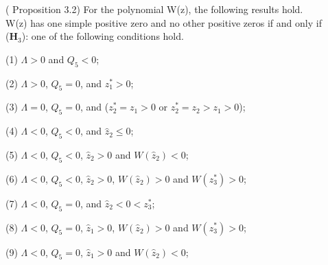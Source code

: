 \documentclass{CMHPhD-SIVD}
\begin{document}
\begin{lemma}\label{3.2} (\cite{wang2019hopf} Proposition 3.2) For the polynomial W(z), the following results hold.\\
W(z) has one simple positive zero and no other positive zeros if and only if
\\ ($\mathbf{H}_3$): one of the
following conditions hold.

(1) $\Lambda>0$ and $Q_5<0$;

(2) $\Lambda>0$, $Q_5=0$, and $z_1^*>0$;

(3) $\Lambda=0$, $Q_5=0$, and ($z_2^*=z_1>0$ or $z_2^*=z_2>z_1>0$);

(4) $\Lambda<0$, $Q_5<0$, and $\hat{z}_2\leq0$;

(5) $\Lambda<0$, $Q_5<0$, $\hat{z}_2>0$ and $W(\hat{z}_2)<0$;

(6) $\Lambda<0$, $Q_5<0$, $\hat{z}_2>0$, $W(\hat{z}_2)>0$ and $W(z_3^*)>0$;

(7) $\Lambda<0$, $Q_5=0$, and $\hat{z}_2<0<z_3^*$;

(8) $\Lambda<0$, $Q_5=0$, $\hat{z}_1>0$, $W(\hat{z}_2)>0$ and $W(z_3^*)>0$;

(9) $\Lambda<0$, $Q_5=0$, $\hat{z}_1>0$ and $W(\hat{z}_2)<0$;\\
%
%
%
%
%

%
%
%
%
%
%
%
%
%
%
%
%
%
\end{lemma}
\end{document}
